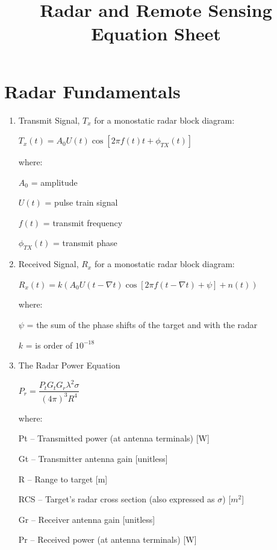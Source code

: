 \documentclass[10pt]{article}
\title{Radar and Remote Sensing Equation Sheet}
\date{}
\renewcommand{\frac}{\dfrac}
\begin{document}
\maketitle

\section*{Radar Fundamentals}

\begin{enumerate}

\item Transmit Signal, $T_x$ for a monostatic radar block diagram: \\
  
  
	\centerline{{$T_x (t) = A_0U(t)\cos[2\pi f(t)t +\phi_{TX}(t)]$}}
 
	where:

	$A_0$ = amplitude

	$U(t)$ = pulse train signal

	$f(t)$ = transmit frequency

	$\phi _{TX}(t)$ = transmit phase
  
  
\item Received Signal, $R_x$ for a monostatic radar block diagram: \\
  
  
	\centerline{$R_x (t) =k(A_0 U(t-\nabla t)\cos[2\pi f(t-\nabla t) + \psi] +n(t))$}
	
	where:

	$\psi$ = the sum of the phase shifts of the target and with the radar

	$k$ = is order of $10^{-18}$
  
  
\item The Radar Power Equation

	\centerline{$P_r = \frac{P_t G_t G_r {\lambda}^2 \sigma}{(4\pi)^3 R^4}$}
	
	where:
	
	Pt – Transmitted power (at antenna terminals) [W]

	Gt – Transmitter antenna gain [unitless]

	R – Range to target [m]
	
	RCS – Target’s radar cross section (also expressed as $\sigma$) [$m^2$]
	
	Gr – Receiver antenna gain  [unitless]
	
	Pr – Received power (at antenna terminals) [W]
	

\end{enumerate}
\end{document}
